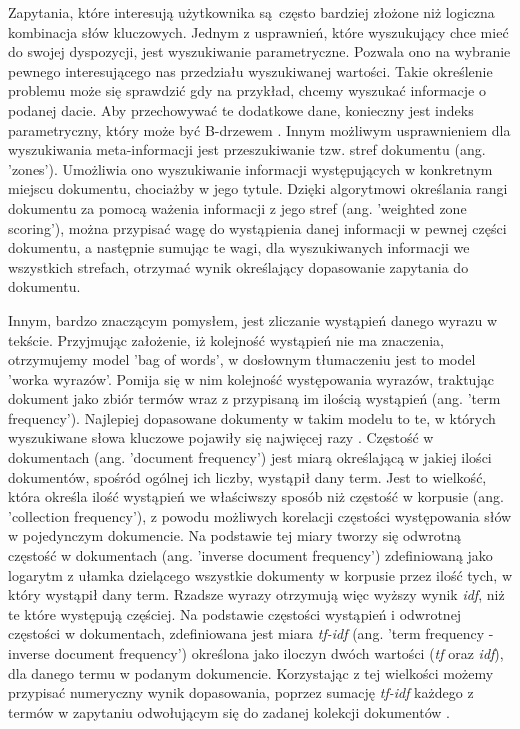 Zapytania, które interesują użytkownika są często bardziej złożone niż logiczna kombinacja słów kluczowych. Jednym z usprawnień, które wyszukujący chce
mieć do swojej dyspozycji, jest wyszukiwanie parametryczne. Pozwala ono na wybranie pewnego
interesującego nas przedziału wyszukiwanej wartości. Takie określenie problemu może się sprawdzić
gdy na przykład, chcemy wyszukać informacje o podanej dacie. Aby przechowywać te dodatkowe dane,
konieczny jest indeks parametryczny, który może być B-drzewem \autocite{introtoinformationretrieval}. Innym
możliwym usprawnieniem dla wyszukiwania meta-informacji jest przeszukiwanie tzw. stref
dokumentu (ang. 'zones'). Umożliwia ono wyszukiwanie informacji występujących w
konkretnym miejscu dokumentu, chociażby w jego tytule. Dzięki algorytmowi określania rangi dokumentu za
pomocą ważenia informacji z jego stref (ang. 'weighted zone scoring'), można przypisać wagę do
wystąpienia danej informacji w pewnej części dokumentu, a następnie sumując te wagi, dla wyszukiwanych informacji we wszystkich strefach, otrzymać
wynik określający dopasowanie zapytania do dokumentu.\newline

Innym, bardzo znaczącym pomysłem, jest zliczanie wystąpień danego wyrazu w tekście.
Przyjmując założenie, iż kolejność wystąpień nie ma znaczenia, otrzymujemy model 'bag of words', w dosłownym tłumaczeniu jest to model 'worka wyrazów'.
Pomija się w nim kolejność występowania wyrazów, traktując dokument jako zbiór termów wraz z
przypisaną im ilością wystąpień (ang. 'term frequency'). Najlepiej dopasowane dokumenty w takim
modelu to te, w których wyszukiwane słowa kluczowe pojawiły się najwięcej razy \autocite{introtoinformationretrieval}. Częstość w
dokumentach (ang. 'document frequency') jest miarą określającą w jakiej ilości dokumentów, spośród ogólnej ich liczby, wystąpił
dany term. Jest to wielkość, która określa ilość wystąpień we właściwszy sposób niż częstość w korpusie (ang.
'collection frequency'), z powodu możliwych korelacji częstości występowania słów
w pojedynczym dokumencie. Na podstawie tej miary tworzy się odwrotną częstość w dokumentach
(ang. 'inverse document frequency') zdefiniowaną jako logarytm z ułamka dzielącego wszystkie
dokumenty w korpusie przez ilość tych, w który wystąpił dany term. Rzadsze wyrazy otrzymują więc wyższy wynik
{\it idf}, niż te które występują częściej. Na podstawie częstości wystąpień i odwrotnej częstości w
dokumentach, zdefiniowana jest miara \textit{tf-idf} (ang. 'term frequency - inverse document frequency')
określona jako iloczyn dwóch wartości (\textit{tf} oraz \textit{idf}), dla danego termu w podanym dokumencie.
Korzystając z tej wielkości możemy przypisać numeryczny wynik dopasowania, poprzez sumację \textit{tf-idf} każdego
z termów w zapytaniu odwołującym się do zadanej kolekcji dokumentów \autocite[s. 146-172]{introtoinformationretrieval}.

